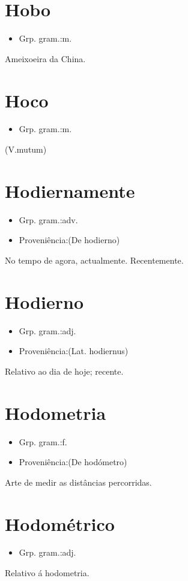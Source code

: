 \documentclass{article}
\begin{document}
\section{Hobo}
\begin{itemize}
\item {Grp. gram.:m.}
\end{itemize}
Ameixoeira da China.
\section{Hoco}
\begin{itemize}
\item {Grp. gram.:m.}
\end{itemize}
(V.mutum)
\section{Hodiernamente}
\begin{itemize}
\item {Grp. gram.:adv.}
\end{itemize}
\begin{itemize}
\item {Proveniência:(De \textunderscore hodierno\textunderscore )}
\end{itemize}
No tempo de agora, actualmente.
Recentemente.
\section{Hodierno}
\begin{itemize}
\item {Grp. gram.:adj.}
\end{itemize}
\begin{itemize}
\item {Proveniência:(Lat. \textunderscore hodiernus\textunderscore )}
\end{itemize}
Relativo ao dia de hoje; recente.
\section{Hodometria}
\begin{itemize}
\item {Grp. gram.:f.}
\end{itemize}
\begin{itemize}
\item {Proveniência:(De \textunderscore hodómetro\textunderscore )}
\end{itemize}
Arte de medir as distâncias percorridas.
\section{Hodométrico}
\begin{itemize}
\item {Grp. gram.:adj.}
\end{itemize}
Relativo á hodometria.
\end{document}
